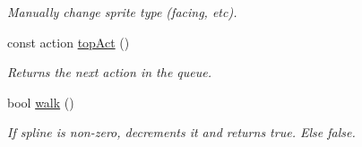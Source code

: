 \begin{DoxyCompactItemize}
\begin{DoxyCompactList}\small\item\em Manually change sprite type (facing, etc). \end{DoxyCompactList}\item 
const action \hyperlink{class_sprite_a3514190934692b2e009f5b6f7d886112}{top\+Act} ()\hypertarget{class_sprite_a3514190934692b2e009f5b6f7d886112}{}\label{class_sprite_a3514190934692b2e009f5b6f7d886112}

\begin{DoxyCompactList}\small\item\em Returns the next action in the queue. \end{DoxyCompactList}\item 
bool \hyperlink{class_sprite_a8ba72650a5a849539d747eea98529d6b}{walk} ()\hypertarget{class_sprite_a8ba72650a5a849539d747eea98529d6b}{}\label{class_sprite_a8ba72650a5a849539d747eea98529d6b}

\begin{DoxyCompactList}\small\item\em If spline is non-\/zero, decrements it and returns true. Else false. \end{DoxyCompactList}\end{DoxyCompactItemize}
